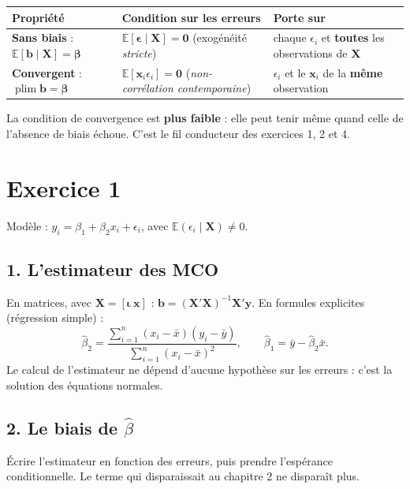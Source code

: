 \documentclass[11pt,a4paper]{article}
\newcommand{\vy}{\mathbf{y}}\newcommand{\vX}{\mathbf{X}}\newcommand{\vb}{\mathbf{b}}\newcommand{\vx}{\mathbf{x}}
\newcommand{\vbeta}{\bm{\beta}}\newcommand{\veps}{\bm{\epsilon}}\newcommand{\Q}{\mathbf{Q}}
\newcommand{\E}{\mathbb{E}}\newcommand{\Var}{\operatorname{Var}}\newcommand{\Cov}{\operatorname{Cov}}
\newcommand{\plim}{\operatorname{plim}}
\newcommand{\sumi}{\sum_{i=1}^{n}}
\begin{document}
\begin{center}
\renewcommand{\arraystretch}{1.3}
\begin{tabular}{@{}p{4.2cm}p{5.6cm}p{5cm}@{}}
\toprule
Propriété & Condition sur les erreurs & Porte sur \\
\midrule
\textbf{Sans biais} : $\E[\vb\mid\vX]=\vbeta$ & $\E[\veps\mid\vX]=\mathbf 0$ (exogénéité \emph{stricte}) & chaque $\epsilon_i$ et \textbf{toutes} les observations de $\vX$ \\
\textbf{Convergent} : $\plim\vb=\vbeta$ & $\E[\vx_i\epsilon_i]=\mathbf 0$ (\emph{non-corrélation contemporaine}) & $\epsilon_i$ et le $\vx_i$ de la \textbf{même} observation \\
\bottomrule
\end{tabular}
\end{center}
La condition de convergence est \textbf{plus faible} : elle peut tenir même quand celle de l'absence de biais échoue. C'est le fil conducteur des exercices 1, 2 et 4.


\section{Exercice 1}

Modèle : $y_i=\beta_1+\beta_2x_i+\epsilon_i$, avec $\E(\epsilon_i\mid\vX)\neq0$.

\subsection*{1. L'estimateur des MCO}
\begin{reponse}
En matrices, avec $\vX=[\bm\iota\ \vx]$ : $\vb=(\vX'\vX)^{-1}\vX'\vy$. En formules explicites (régression simple) :
\[
\hat\beta_2=\frac{\sumi(x_i-\bar x)(y_i-\bar y)}{\sumi(x_i-\bar x)^2},\qquad \hat\beta_1=\bar y-\hat\beta_2\bar x .
\]
Le calcul de l'estimateur ne dépend d'aucune hypothèse sur les erreurs : c'est la solution des équations normales.
\end{reponse}

\subsection*{2. Le biais de $\hat\beta$}

\begin{idee}
Écrire l'estimateur en fonction des erreurs, puis prendre l'espérance conditionnelle. Le terme qui disparaissait au chapitre 2 ne disparaît plus.
\end{idee}
\end{document}

